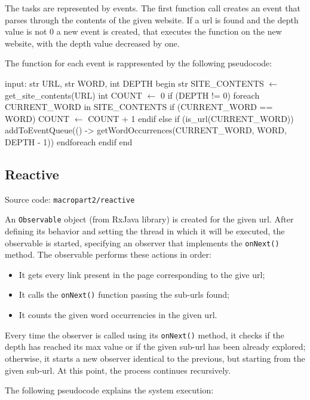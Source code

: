 \documentclass[12pt, a4paper]{report}
\begin{document}
The tasks are represented by events. The first function call creates an event that parses through the contents of the given website.
 If a url is found and the depth value is not 0 a new event is created, that executes the function on the new website, with the depth value decreased by one.

 The function for each event is rappresented by the following pseudocode:

\newpage

\begin{algorithm}[label={alg3}]
input: str URL, str WORD, int DEPTH
begin
    str SITE_CONTENTS $\gets$ get_site_contents(URL)
    int COUNT $\gets$ 0
    if (DEPTH != 0)
        foreach CURRENT_WORD in SITE_CONTENTS
            if (CURRENT_WORD == WORD)
                COUNT $\gets$ COUNT + 1
            endif
            else if (is_url(CURRENT_WORD))
                addToEventQueue(() -> 
                    getWordOccurrences(CURRENT_WORD, WORD, DEPTH - 1))
        endforeach
    endif
end       
\end{algorithm}

\subsection{Reactive}
Source code: \texttt{macropart2/reactive}

An \texttt{Observable} object (from RxJava library) is created  for the given url.
After defining its behavior and setting the thread in which it will be executed, the observable is started, specifying an observer that implements the \texttt{onNext()} method.
The observable performs these actions in order:
\begin{itemize}
    \item It gets every link present in the page corresponding to the give url;
    \item It calls the \texttt{onNext()} function passing the sub-urls found;
    \item It counts the given word occurrencies in the given url.
\end{itemize}
Every time the observer is called using its \texttt{onNext()} method, it checks if the depth has reached its max value or if the given sub-url has been already explored; otherwise, it starts a new observer identical to the previous, but starting from the given sub-url.
At this point, the process continues recursively.

The following pseudocode explains the system execution:
\end{document}

